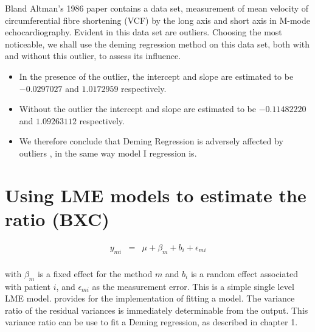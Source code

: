 \documentclass[12pt, a4paper]{report}
\theoremstyle{plain}
\theoremstyle{definition}
\theoremstyle{remark}
\begin{document}
Bland Altman's 1986 paper contains a data set, measurement of mean velocity of circumferential fibre shortening (VCF) by the long axis and short axis in M-mode echocardiography. Evident in this data set are outliers. Choosing the most noticeable, we shall use the deming regression method on this data set, both with and
without this outlier, to assess its influence.
\begin{itemize}
	\item In the presence of the outlier, the intercept and slope are estimated to be $-0.0297027$ and $1.0172959$ respectively.
	\item Without the outlier the intercept and slope are estimated to be
	$-0.11482220$ and  $1.09263112$ respectively.
	\item We therefore conclude that Deming Regression is adversely affected
	by outliers , in the same way model I regression is.
\end{itemize}
















\section{Using LME models to estimate the ratio (BXC) }

\begin{eqnarray*}
	y_{mi} &=& \mu + \beta_{m} + b_{i} + \epsilon_{mi}\\
\end{eqnarray*}

with $\beta_{m}$ is a fixed effect for the method $m$ and $b_{i}$ is a random effect associated with patient $i$, and
$\epsilon_{mi}$ as the measurement error. This is a simple single level LME model. \citet{pb} provides for the implementation of fitting a model. The variance ratio of the residual variances is immediately determinable from the output. This variance ratio can be use to fit a Deming regression, as described in chapter 1.
\end{document}
